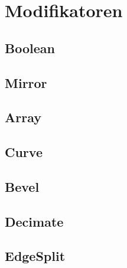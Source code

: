 \section{Modifikatoren}
\subsection{Boolean}
\subsection{Mirror}
\subsection{Array}
\subsection{Curve}
\subsection{Bevel}
\subsection{Decimate}
\subsection{EdgeSplit}